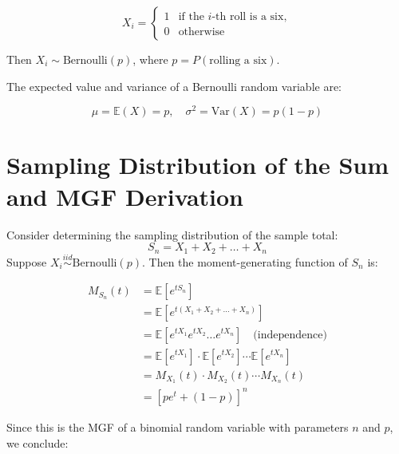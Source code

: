 \[
X_i =
\begin{cases}
1 & \text{if the } i\text{-th roll is a six}, \\
0 & \text{otherwise}
\end{cases}
\]

Then \( X_i \sim \text{Bernoulli}(p) \), where \( p = P(\text{rolling a six}) \). 


The expected value and variance of a Bernoulli random variable are:

\[
\mu = \mathbb{E}(X) = p, \quad \sigma^2 = \mathrm{Var}(X) = p(1 - p)
\]



\section{Sampling Distribution of the Sum and MGF Derivation}

Consider determining the sampling distribution of the sample total:
\[
S_n = X_1 + X_2 + \dots + X_n
\]
Suppose \( X_i \overset{iid}{\sim} \text{Bernoulli}(p) \). Then the moment-generating function of \( S_n \) is:

\begin{align*}
M_{S_n}(t) &= \mathbb{E}[e^{t S_n}] \\
           &= \mathbb{E}\left[e^{t(X_1 + X_2 + \dots + X_n)}\right] \\
           &= \mathbb{E}\left[e^{tX_1} e^{tX_2} \dots e^{tX_n} \right] \quad \text{(independence)} \\
           &= \mathbb{E}[e^{tX_1}] \cdot \mathbb{E}[e^{tX_2}] \cdots \mathbb{E}[e^{tX_n}] \\
           &= M_{X_1}(t) \cdot M_{X_2}(t) \cdots M_{X_n}(t) \\
           &= \left[pe^t + (1 - p)\right]^n
\end{align*}


Since this is the MGF of a binomial random variable with parameters \( n \) and \( p \), we conclude:

